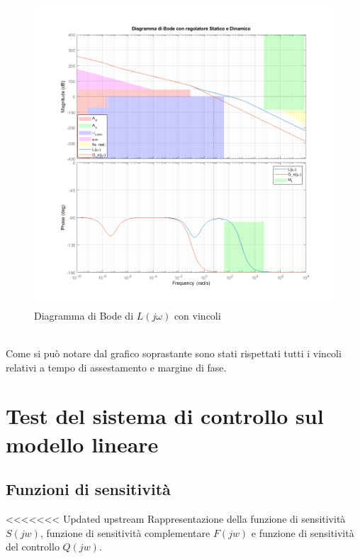 \documentclass{article}
\begin{document}
\begin{figure}[!h]
\centering
\includegraphics[width=1\textwidth]{grafici/fig3.png}
\caption{\label{fig:orbit}Diagramma di Bode di $L(j\omega)$ con vincoli}
\end{figure}\\
Come si può notare dal grafico soprastante sono stati rispettati tutti i vincoli relativi a tempo di assestamento e margine di fase.
\pagebreak

\section{Test del sistema di controllo sul modello lineare}
\subsection{Funzioni di sensitività}
<<<<<<< Updated upstream
Rappresentazione della funzione di sensitività $S(jw)$, funzione di sensitività complementare $F(jw)$ e funzione di sensitività del controllo $Q(jw)$.
\end{document}
